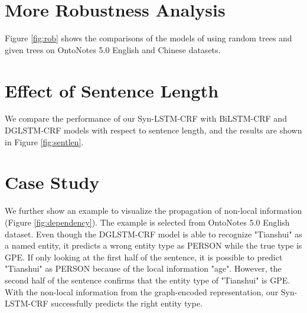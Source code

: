 \documentclass[11pt]{article}
\begin{document}
\section{More Robustness Analysis}
Figure \ref{fig:rob} shows the comparisons of the models of using random trees and given trees on OntoNotes 5.0 English and Chinese datasets.

\section{Effect of Sentence Length}
We compare the performance of our Syn-LSTM-CRF with BiLSTM-CRF and DGLSTM-CRF models with respect to sentence length, and the results are shown in Figure \ref{fig:sentlen}. 



\section{Case Study}
We further show an example to visualize the propagation of non-local information (Figure \ref{fig:dependency}). The example is selected from OntoNotes 5.0 English dataset. Even though the DGLSTM-CRF \cite{Jie2019DependencyGuidedLF} model is able to recognize "Tianshui" as a named entity, it predicts a wrong entity type as PERSON while the true type is GPE. If only looking at the first half of the sentence, it is possible to predict "Tianshui" as PERSON because of the local information "age". However, the second half of the sentence confirms that the entity type of "Tianshui" is GPE. With the non-local information from the graph-encoded representation, our Syn-LSTM-CRF successfully predicts the right entity type. 
\end{document}
